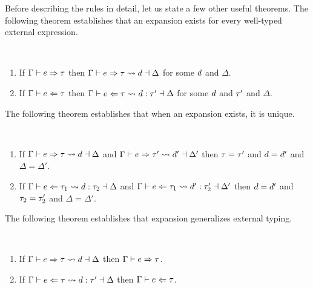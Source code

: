 Before describing the rules in detail, let us state a few other useful theorems. 
The following theorem establishes that an expansion exists for every well-typed external expression.
 \begin{thm}[Expandability] \label{thm:expandability}~
  \begin{enumerate}[nolistsep]
    \item
      If $\Gamma \vdash e \Rightarrow \tau$
      then $\Gamma \vdash e \Rightarrow \tau \leadsto d \dashv \Delta$
      for some $d$ and $\Delta$.
    \item
      If $\Gamma \vdash e \Leftarrow \tau$
      then $\Gamma \vdash e \Leftarrow \tau \leadsto d : \tau' \dashv \Delta$
      for some $d$ and $\tau'$ and $\Delta$.
  \end{enumerate}
\end{thm}
\noindent
The following theorem establishes that when an expansion exists, it is unique.
\begin{thm} \label{thm:expansion-unicity}~
  \begin{enumerate}[nolistsep]
    \item
      If $\Gamma \vdash e \Rightarrow \tau \leadsto d \dashv \Delta$
      and $\Gamma \vdash e \Rightarrow \tau' \leadsto d' \dashv \Delta'$
      then $\tau=\tau'$ and $d=d'$ and $\Delta=\Delta'$.
    \item
      If $\Gamma \vdash e \Leftarrow \tau_1 \leadsto d : \tau_2 \dashv \Delta$
      and $\Gamma \vdash e \Leftarrow \tau_1 \leadsto d' : \tau_2' \dashv \Delta'$
      then $d=d'$ and $\tau_2=\tau_2'$ and $\Delta=\Delta'$.
  \end{enumerate}
\end{thm}
\noindent
The following theorem establishes that expansion generalizes external typing.
\begin{thm} \label{thm:expansion-generality}~
  \begin{enumerate}[nolistsep]
    \item
      If $\Gamma \vdash e \Rightarrow \tau \leadsto d \dashv \Delta$
      then $\Gamma \vdash e \Rightarrow \tau$.
    \item
      If $\Gamma \vdash e \Leftarrow \tau \leadsto d : \tau' \dashv \Delta$
      then $\Gamma \vdash e \Leftarrow \tau$.
  \end{enumerate}
\end{thm}

